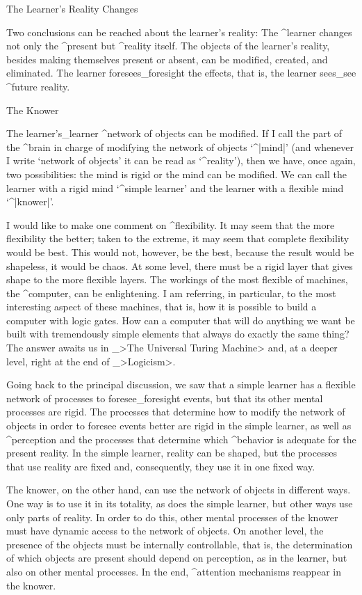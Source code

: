 \Section The Learner's Reality Changes

Two conclusions can be reached about the learner's reality:
\point The ^{learner} changes not only the ^{present} but
^{reality} itself. The objects of the learner's reality, besides making
themselves present or absent, can be modified, created, and eliminated.
\point The learner foresees_{foresight} the effects, that is, the learner
sees_{see} ^{future} reality.


\Section The Knower

The learner's_{learner} ^{network of objects} can be modified. If I call
the part of the ^{brain} in charge of modifying the network of objects
`^|mind|' (and whenever I write `network of objects' it can be read as
`^{reality}'), then we have, once again, two possibilities: the mind is
rigid or the mind can be modified. We can call the learner with a rigid
mind `^{simple learner}' and the learner with a flexible mind
`^|knower|'.

I would like to make one comment on ^{flexibility}. It may seem that the
more flexibility the better; taken to the extreme, it may seem that
complete flexibility would be best. This would not, however, be the
best, because the result would be shapeless, it would be chaos. At some
level, there must be a rigid layer that gives shape to the more flexible
layers. The workings of the most flexible of machines, the ^{computer},
can be enlightening. I am referring, in particular, to the most
interesting aspect of these machines, that is, how it is possible to
build a computer with logic gates. How can a computer that will do
anything we want be built with tremendously simple elements that always
do exactly the same thing? The answer awaits us in _>The Universal
Turing Machine> and, at a deeper level, right at the end of _>Logicism>.

Going back to the principal discussion, we saw that a simple learner has
a flexible network of processes to foresee_{foresight} events, but that
its other mental processes are rigid. The processes that determine how
to modify the network of objects in order to foresee events better are
rigid in the simple learner, as well as ^{perception} and the processes
that determine which ^{behavior} is adequate for the present reality. In
the simple learner, reality can be shaped, but the processes that use
reality are fixed and, consequently, they use it in one fixed way.

The knower, on the other hand, can use the network of objects in
different ways. One way is to use it in its totality, as does the simple
learner, but other ways use only parts of reality. In order to do this,
other mental processes of the knower must have dynamic access to the
network of objects. On another level, the presence of the objects must
be internally controllable, that is, the determination of which objects
are present should depend on perception, as in the learner, but also on
other mental processes. In the end, ^{attention} mechanisms reappear in
the knower.


